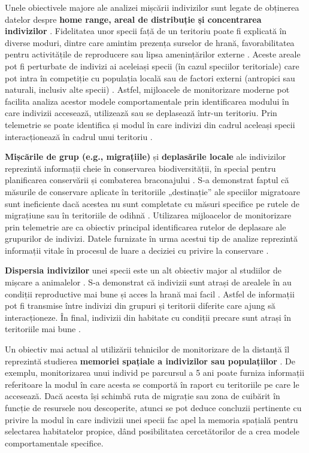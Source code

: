 \documentclass[11pt,onehalfspacing]{elife}
\begin{document}
Unele obiectivele majore ale analizei mișcării indivizilor sunt legate de obținerea datelor despre \textbf{home range, areal de distribuție și concentrarea indivizilor} \citep{Hooten2017}. Fidelitatea unor specii față de un teritoriu poate fi explicată în diverse moduri, dintre care amintim prezența surselor de hrană, favorabilitatea pentru activitățile de reproducere sau lipsa amenințărilor externe \citep{schjorring_gregersen_bregnballe_2000}. Aceste areale pot fi perturbate de indivizi ai aceleiași specii (în cazul speciilor teritoriale) care pot intra în competiție cu populația locală sau de factori externi (antropici sau naturali, inclusiv alte specii) \citep{frid_dill_2002}. Astfel, mijloacele de monitorizare moderne pot facilita analiza acestor modele comportamentale prin identificarea modului în care indivizii accesează, utilizează sau se deplasează într-un teritoriu. Prin telemetrie se poate identifica și modul în care indivizi din cadrul aceleași specii interacționează în cadrul unui teritoriu \citep{millspaugh_2001}.

\textbf{Mișcările de grup (e.g., migrațiile)} și \textbf{deplasările locale} ale indivizilor reprezintă informații cheie în conservarea biodiversității, în special pentru planificarea conservării și combaterea braconajului \citep{Hooten2017}. S-a demonstrat faptul că măsurile de conservare  aplicate în teritoriile „destinație” ale speciilor migratoare sunt ineficiente dacă acestea nu sunt completate cu măsuri specifice pe rutele de migrațiune sau în teritoriile de odihnă \citep{singh_milner-gulland_2010}. Utilizarea mijloacelor de monitorizare prin telemetrie are ca obiectiv principal identificarea rutelor de deplasare ale grupurilor de indivizi. Datele furnizate în urma acestui tip de analize reprezintă informații vitale în procesul de luare a deciziei cu privire la conservare \citep{martell_henny_nye_solensky_2001, hebblewhite_haydon_2010}.

\textbf{Dispersia indivizilor} unei specii este un alt obiectiv major al studiilor de mișcare a animalelor \citep{Hooten2017}. S-a demonstrat că indivizii sunt atrași de arealele în au condiții reproductive mai bune și acces la hrană mai facil \citep{begon_harper_townsend_2006}. Astfel de informații pot fi transmise între indivizi din grupuri și teritorii diferite care ajung să interacționeze. În final, indivizii din habitate cu condiții precare sunt atrași în teritoriile mai bune \citep{Hooten2017}.

Un obiectiv mai actual al utilizării tehnicilor de monitorizare de la distanță îl reprezintă studierea \textbf{memoriei spațiale a indivizilor sau populațiilor} \citep{Hooten2017}. De exemplu, monitorizarea unui individ pe parcursul a 5 ani poate furniza informații referitoare la modul în care acesta se comportă în raport cu teritoriile pe care le accesează. Dacă acesta își schimbă ruta de migrație sau zona de cuibărit în funcție de resursele nou descoperite, atunci se pot deduce concluzii pertinente cu privire la modul în care indivizii unei specii fac apel la memoria spațială pentru selectarea habitatelor propice, dând posibilitatea cercetătorilor de a crea modele comportamentale specifice.
\end{document}
